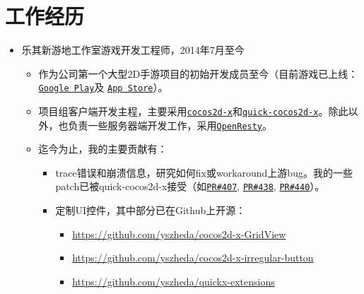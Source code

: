 \documentclass[letterpaper]{article}
\begin{document}

\section*{工作经历}
\begin{itemize}
    \item 乐其新游地工作室游戏开发工程师，2014年7月至今
        \begin{itemize}
            \item 作为公司第一个大型2D手游项目的初始开发成员至今（目前游戏已上线：
                \href{https://play.google.com/store/apps/details?id=com.game168.yysg}{\tt Google Play}及
                \href{https://itunes.apple.com/us/app/ye-ye-san-guo/id976517523?mt=8}{\tt App Store}）。
            \item 项目组客户端开发主程，主要采用\href{http://cocos2d-x.org/}{\tt cocos2d-x}和\href{https://github.com/dualface/v3quick}{\tt quick-cocos2d-x}。除此以外，也负责一些服务器端开发工作，采用\href{https://github.com/openresty/openresty}{\tt OpenResty}。
            \item 迄今为止，我的主要贡献有：
                \begin{itemize}
                    \item trace错误和崩溃信息，研究如何fix或workaround上游bug。我的一些patch已被quick-cocos2d-x接受（如\href{https://github.com/dualface/v3quick/pull/407}{\tt PR\#407}, \href{https://github.com/dualface/v3quick/pull/438}{\tt PR\#438}, \href{https://github.com/dualface/v3quick/pull/440}{\tt PR\#440}）。
                    \item 定制UI控件，其中部分已在Github上开源：
                        \begin{itemize}
                            \item \url{https://github.com/yszheda/cocos2d-x-GridView}
                            \item \url{https://github.com/yszheda/cocos2d-x-irregular-button}
                            \item \url{https://github.com/yszheda/quickx-extensions}

\end{itemize}
\end{itemize}
\end{itemize}
\end{itemize}
\end{document}
